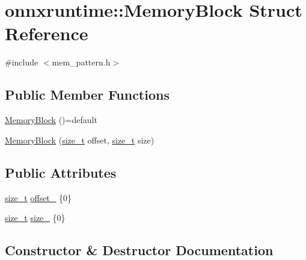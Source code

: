 \hypertarget{structonnxruntime_1_1MemoryBlock}{}\section{onnxruntime\+:\+:Memory\+Block Struct Reference}
\label{structonnxruntime_1_1MemoryBlock}


{\ttfamily \#include $<$mem\+\_\+pattern.\+h$>$}

\subsection*{Public Member Functions}
\begin{DoxyCompactItemize}
\item 
\mbox{\hyperlink{structonnxruntime_1_1MemoryBlock_a083891d9aaad63379f9c6ef76da167d6}{Memory\+Block}} ()=default
\item 
\mbox{\hyperlink{structonnxruntime_1_1MemoryBlock_ab760e81a71849d79df27bac38c2b2b5e}{Memory\+Block}} (\mbox{\hyperlink{mlasi_8h_a503efbc1c6e50825320ad909366b78ab}{size\+\_\+t}} offset, \mbox{\hyperlink{mlasi_8h_a503efbc1c6e50825320ad909366b78ab}{size\+\_\+t}} size)
\end{DoxyCompactItemize}
\subsection*{Public Attributes}
\begin{DoxyCompactItemize}
\item 
\mbox{\hyperlink{mlasi_8h_a503efbc1c6e50825320ad909366b78ab}{size\+\_\+t}} \mbox{\hyperlink{structonnxruntime_1_1MemoryBlock_a01f9644f997629495fc7fc3aa11d6a07}{offset\+\_\+}} \{0\}
\item 
\mbox{\hyperlink{mlasi_8h_a503efbc1c6e50825320ad909366b78ab}{size\+\_\+t}} \mbox{\hyperlink{structonnxruntime_1_1MemoryBlock_a6ac92a87b7de224095a042b354ac6fd1}{size\+\_\+}} \{0\}
\end{DoxyCompactItemize}


\subsection{Constructor \& Destructor Documentation}
\mbox{\label{structonnxruntime_1_1MemoryBlock_a083891d9aaad63379f9c6ef76da167d6}} 
